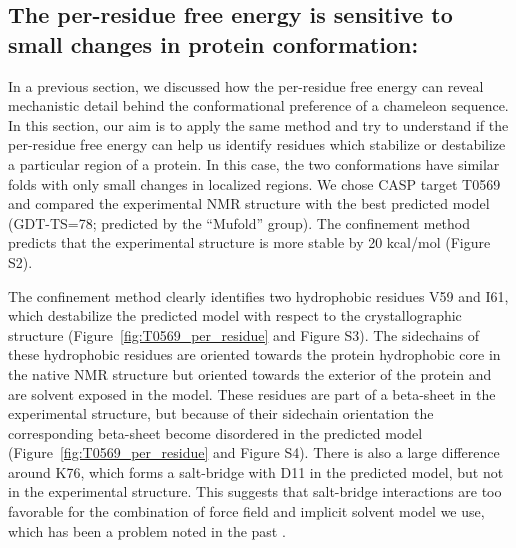 \documentclass[12pt]{article}
\begin{document}
\subsection*{The per-residue free energy is sensitive to small changes in protein conformation:}

In a previous section, we discussed how the per-residue free energy can reveal mechanistic
detail behind the conformational preference of a chameleon sequence. In this section, our aim is to apply the same
method and try to understand if the per-residue free energy can help us identify residues which stabilize or destabilize
a particular region of a protein. In this case, the two conformations have similar folds with only small changes in
localized regions. We chose CASP target T0569 and compared the experimental NMR structure with the best predicted model
(GDT-TS=78; predicted by the ``Mufold'' group). The confinement method predicts that the experimental structure is more stable
by 20 kcal/mol (Figure S2).

The confinement method clearly identifies two hydrophobic residues V59 and I61, which destabilize the predicted model
with respect to the crystallographic structure (Figure~\ref{fig:T0569_per_residue} and Figure S3). The sidechains of
these hydrophobic residues are oriented towards the protein hydrophobic core in the native NMR structure but oriented
towards the exterior of the protein and are solvent exposed in the model. These residues are part of a beta-sheet
in the experimental structure, but because of their sidechain orientation the corresponding beta-sheet become disordered in the predicted model 
(Figure~\ref{fig:T0569_per_residue} and Figure S4). There is also a large
difference around K76, which forms a salt-bridge with D11 in the predicted model, but not in the experimental structure.
This suggests that salt-bridge interactions are too favorable for the combination of force field and implicit solvent
model we use, which has been a problem noted in the past \cite{Roe2007}.
\end{document}
